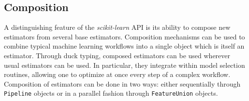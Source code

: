 \documentclass{llncs}
\begin{document}



\subsection{Composition}

A distinguishing feature of the \textit{scikit-learn} API is its ability to
compose new estimators from several base estimators. Composition mechanisms can
be used to combine typical machine learning workflows into a single object which
is itself an estimator. Through duck typing, composed
estimators can be used wherever usual estimators can be used. In particular,
they integrate within model selection routines, allowing one to optimize at once
every step of a complex workflow. Composition of estimators can be done in two
ways: either sequentially through \texttt{Pipeline} objects or in a parallel
fashion through \texttt{FeatureUnion} objects.
\end{document}
